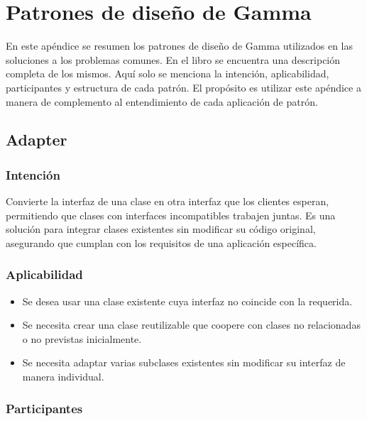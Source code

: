

\chapter{Patrones de diseño de Gamma}
\label{apendice}

En este apéndice se resumen los patrones de diseño de Gamma \cite{Gamma:1995:DPE:186897} utilizados en las soluciones a los problemas comunes. En el libro se encuentra una descripción completa de los mismos. Aquí solo se menciona la intención, aplicabilidad, participantes y estructura de cada patrón. El propósito es utilizar este apéndice a manera de complemento al entendimiento de cada aplicación de patrón.

\section{Adapter}

\subsection*{Intención}

Convierte la interfaz de una clase en otra interfaz que los clientes esperan, permitiendo que clases con interfaces incompatibles trabajen juntas. Es una solución para integrar clases existentes sin modificar su código original, asegurando que cumplan con los requisitos de una aplicación específica.

\subsection*{Aplicabilidad}

\begin{itemize}
\item Se desea usar una clase existente cuya interfaz no coincide con la requerida.
\item Se necesita crear una clase reutilizable que coopere con clases no relacionadas o no previstas inicialmente.
\item Se necesita adaptar varias subclases existentes sin modificar su interfaz de manera individual.
\end{itemize}


\subsection*{Participantes}

